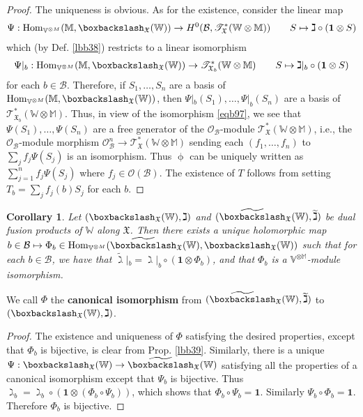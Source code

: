 \documentclass[11pt,b5paper,notitlepage]{article}
\theoremstyle{definition}
\theoremstyle{plain}
\newtheorem{co}[df]{Corollary}
\newcommand{\mc}{\mathcal}
\newcommand{\wtd}{\widetilde}
\newcommand{\idt}{\mathbf{1}}
\newcommand{\Hom}{\mathrm{Hom}}
\newcommand{\scr}{\mathscr}
\newcommand{\Vbb}{\mathbb V}
\newcommand{\Wbb}{\mathbb W}
\newcommand{\Mbb}{\mathbb M}
\newcommand{\<}{\left\langle}
\renewcommand{\>}{\right\rangle}
\newcommand{\MO}{\mathcal{O}}
\newcommand{\MB}{\mathcal{B}}
\newcommand{\fx}{\mathfrak{X}}
\newcommand{\bbs}{\boxbackslash}
\numberwithin{equation}{section}
\begin{document}
\begin{proof}
The uniqueness is obvious. As for the existence, consider the linear map
\begin{align*}
\Psi:\Hom_{\Vbb^{\otimes M}}(\Mbb,\bbs_\fx(\Wbb))\rightarrow H^0(\MB,\scr T_\fx^*(\Wbb\otimes\Mbb))\qquad S\mapsto \gimel\circ(\idt\otimes S)
\end{align*}
which (by Def. \ref{lbb38}) restricts to a linear isomorphism
\begin{align*}
\Psi|_b:\Hom_{\Vbb^{\otimes M}}(\Mbb,\bbs_\fx(\Wbb))\rightarrow \scr T_{\fx_b}^*(\Wbb\otimes\Mbb)\qquad S\mapsto\gimel|_b\circ(\idt\otimes S)
\end{align*}
for each $b\in\MB$. Therefore, if $S_1,\dots,S_n$ are a basis of $\Hom_{\Vbb^{\otimes M}}(\Mbb,\bbs_\fx(\Wbb))$, then $\Psi|_b(S_1),\dots,\Psi|_b(S_n)$ are a basis of $\scr T_{\fx_b}^*(\Wbb\otimes\Mbb)$. Thus, in view of the isomorphism \eqref{eqb97}, we see that $\Psi(S_1),\dots,\Psi(S_n)$ are a free generator of the $\mc O_\MB$-module $\scr T_\fx^*(\Wbb\otimes\Mbb)$, i.e., the $\MO_\MB$-module morphism $\MO_\MB^n\rightarrow \scr T_\fx^*(\Wbb\otimes\Mbb)$ sending each $(f_1,\dots,f_n)$ to $\sum_j f_j\Psi(S_j)$ is an isomorphism. Thus $\upphi$ can be uniquely written as $\sum_{j=1}^n f_j\Psi(S_j)$ where $f_j\in\mc O(\MB)$. The existence of $T$ follows from setting $T_b=\sum_j f_j(b)S_j$ for each $b$.
\end{proof}


\begin{co}\label{lbb40}
Let $(\bbs_\fx(\Wbb),\gimel)$ and $(\wtd\bbs_\fx(\Wbb),\wtd\gimel)$ be dual fusion products of $\Wbb$ along $\fx$. Then there exists a unique holomorphic map $b\in\MB\mapsto \Phi_b\in\Hom_{\Vbb^{\otimes M}}(\wtd\bbs_\fx(\Wbb),\bbs_\fx(\Wbb))$ such that for each $b\in\MB$, we have that $\wtd\gimel|_b=\gimel|_b\circ(\idt\otimes \Phi_b)$, and that $\Phi_b$ is a $\Vbb^{\otimes\Mbb}$-module isomorphism.
\end{co}

We call $\Phi$ the \textbf{canonical isomorphism} from $(\wtd\bbs_\fx(\Wbb),\wtd\gimel)$ to $(\bbs_\fx(\Wbb),\gimel)$.


\begin{proof}
The existence and uniqueness of $\Phi$ satisfying the desired properties, except that $\Phi_b$ is bijective, is clear from Prop. \ref{lbb39}. Similarly, there is a unique $\Psi:\bbs_\fx(\Wbb)\rightarrow\wtd\bbs_\fx(\Wbb)$ satisfying all the properties of a canonical isomorphism except that $\Psi_b$ is bijective. Thus $\gimel_b=\gimel_b\circ(\idt\otimes(\Phi_b\circ\Psi_b))$, which shows that $\Phi_b\circ\Psi_b=\idt$. Similarly $\Psi_b\circ\Phi_b=\idt$. Therefore $\Phi_b$ is bijective. 
\end{proof}
\end{document}
